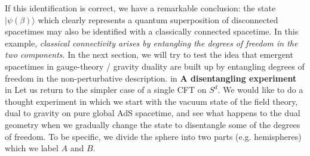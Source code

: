 \documentclass[12pt,epsf]{article}
\renewcommand{\(}{\left(}
\renewcommand{\)}{\right)}
\begin{document}
If this identification is correct, we have a remarkable conclusion: the state $|\psi (\beta) \rangle$ which clearly represents a quantum superposition of disconnected spacetimes may also be identified with a classically connected spacetime. In this example, {\it classical connectivity arises by entangling the degrees of freedom in the two components}. In the next section, we will try to test the idea that emergent spacetimes in gauge-theory / gravity duality are built up by entangling degrees of freedom in the non-perturbative description.
 in
\noindent
{\bf A disentangling experiment}
 in
\noindent
Let us return to the simpler case of a single CFT on $S^d$. We would like to do a thought experiment in which we start with the vacuum state of the field theory, dual to gravity on pure global AdS spacetime, and see what happens to the dual geometry when we gradually change the state to disentangle some of the degrees of freedom. To be specific, we divide the sphere into two parts (e.g. hemispheres) which we label $A$ and $B$.
\end{document}
